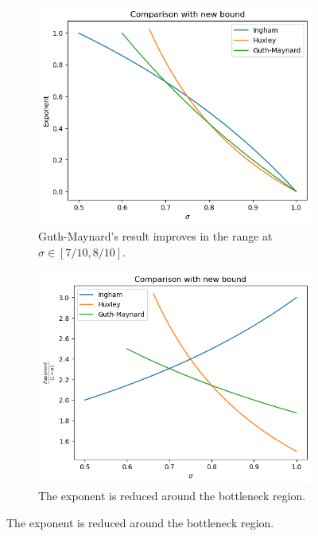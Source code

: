 \begin{figure}[h]
    \centering
    \begin{subfigure}{0.4\textwidth}
        \includegraphics[width=\textwidth]{gm_1.png}
        \caption{Guth-Maynard's result improves in the range at $\sigma\in[7/10,8/10].$}
    \end{subfigure}
    \begin{subfigure}{0.4\textwidth}
        \includegraphics[width=\textwidth]{gm_2.png}
        \caption{The exponent is reduced around the bottleneck region.}
    \end{subfigure}
\end{figure}